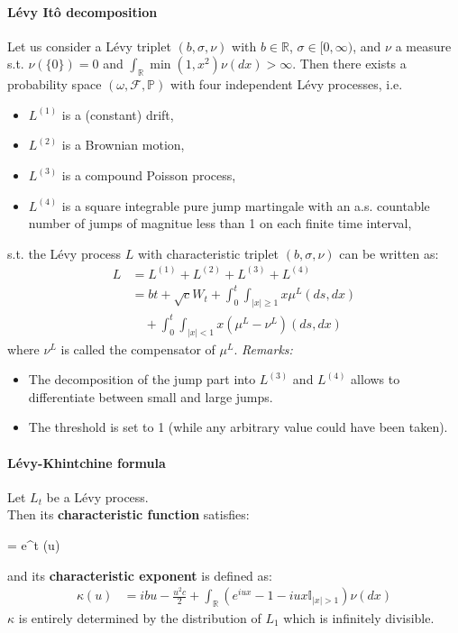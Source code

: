 \documentclass[a4paper,landscape,7pt,fleqn]{scrartcl}
\newcommand*\widefbox[1]{\fbox{\hspace{2em}#1\hspace{2em}}}		%
\renewcommand{\emph}[1]{\textbf{#1}}
\begin{document}
\begin{multicols*}{3}
\paragraph{Lévy Itô decomposition}
Let us consider a Lévy triplet $(b, \sigma, \nu)$ with $b \in \mathbb{R}$, $\sigma \in [0,\infty)$, and $\nu$ a measure s.t. $\nu(\lbrace 0 \rbrace) = 0$ and $\int_\mathbb{R} \min(1,x^2) \nu(dx) > \infty$. Then there exists a probability space $(\omega, \mathcal{F}, \mathbb{P})$ with four independent Lévy processes, i.e.
\begin{itemize}
\item $L^{(1)}$ is a (constant) drift,
\item $L^{(2)}$ is a Brownian motion,
\item $L^{(3)}$ is a compound Poisson process,
\item $L^{(4)}$ is a square integrable pure jump martingale with an a.s. countable number of jumps of magnitue less than 1 on each finite time interval,
\end{itemize}
s.t. the Lévy process $L$ with characteristic triplet $(b, \sigma, \nu)$ can be written as:
\begin{align*}
L &= L^{(1)} + L^{(2)} + L^{(3)} + L^{(4)} \\
&= b t + \sqrt{c} W_t + \int_0^t \int_{|x| \geq 1} x \mu^L(ds, dx) \\
& \quad + \int_0^t \int_{|x| < 1} x (\mu^L - \nu^L) (ds, dx)
\end{align*}
where $\nu^L$ is called the compensator of $\mu^L$.
\textit{Remarks:}
\begin{itemize}
\item The decomposition of the jump part into $L^{(3)}$ and $L^{(4)}$ allows to differentiate between small and large jumps.
\item The threshold is set to 1 (while any arbitrary value could have been taken).
\end{itemize}

\paragraph{Lévy-Khintchine formula}
Let $L_t$ be a Lévy process. \\
Then its \emph{characteristic function} satisfies:
\begin{empheq}[box=\widefbox]{align*}
\varphi_{L_t}(u,t) &=  \mathbb{E}[e^{i u L_t}] = e^{t \kappa(u)}
\end{empheq}
and its \emph{characteristic exponent} is defined as:
\begin{align*}
\kappa(u) &= i b u - \frac{u^2 c}{2} + \int_\mathbb{R} \left( e^{i u x} - 1 - i u x \mathbb{I}_{|x| > 1} \right) \nu(dx)
\end{align*}
$\kappa$ is entirely determined by the distribution of $L_1$ which is infinitely divisible.


\end{multicols*}
\end{document}
